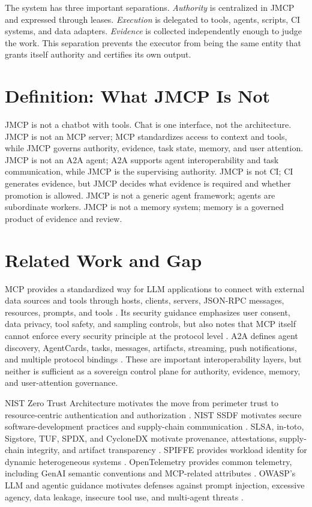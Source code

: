 \documentclass[12pt,journal,onecolumn,draftclsnofoot]{IEEEtran}
\begin{document}
The system has three important separations. \emph{Authority} is centralized in JMCP and expressed through leases. \emph{Execution} is delegated to tools, agents, scripts, CI systems, and data adapters. \emph{Evidence} is collected independently enough to judge the work. This separation prevents the executor from being the same entity that grants itself authority and certifies its own output.

\section{Definition: What JMCP Is Not}
JMCP is not a chatbot with tools. Chat is one interface, not the architecture. JMCP is not an MCP server; MCP standardizes access to context and tools, while JMCP governs authority, evidence, task state, memory, and user attention. JMCP is not an A2A agent; A2A supports agent interoperability and task communication, while JMCP is the supervising authority. JMCP is not CI; CI generates evidence, but JMCP decides what evidence is required and whether promotion is allowed. JMCP is not a generic agent framework; agents are subordinate workers. JMCP is not a memory system; memory is a governed product of evidence and review.

\section{Related Work and Gap}
MCP provides a standardized way for LLM applications to connect with external data sources and tools through hosts, clients, servers, JSON-RPC messages, resources, prompts, and tools \cite{mcp2025}. Its security guidance emphasizes user consent, data privacy, tool safety, and sampling controls, but also notes that MCP itself cannot enforce every security principle at the protocol level \cite{mcp2025}. A2A defines agent discovery, AgentCards, tasks, messages, artifacts, streaming, push notifications, and multiple protocol bindings \cite{a2a2026}. These are important interoperability layers, but neither is sufficient as a sovereign control plane for authority, evidence, memory, and user-attention governance.

NIST Zero Trust Architecture motivates the move from perimeter trust to resource-centric authentication and authorization \cite{nistzt}. NIST SSDF motivates secure software-development practices and supply-chain communication \cite{nistssdf}. SLSA, in-toto, Sigstore, TUF, SPDX, and CycloneDX motivate provenance, attestations, supply-chain integrity, and artifact transparency \cite{slsa,in_toto,sigstore,tuf,spdx,cyclonedx}. SPIFFE provides workload identity for dynamic heterogeneous systems \cite{spiffe}. OpenTelemetry provides common telemetry, including GenAI semantic conventions and MCP-related attributes \cite{otel,otelgenai}. OWASP's LLM and agentic guidance motivates defenses against prompt injection, excessive agency, data leakage, insecure tool use, and multi-agent threats \cite{owaspllm,owaspagentic}.
\end{document}
